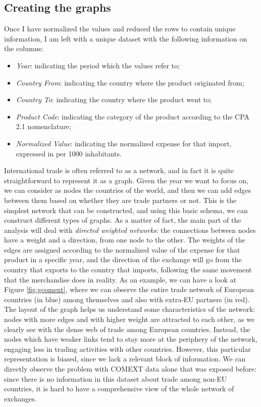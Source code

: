\subsection{Creating the graphs}
Once I have normalized the values and reduced the rows to contain unique information, I am left with a unique dataset with the following information on the columns:
\begin{itemize}
    \item \textit{Year}: indicating the period which the values refer to;
    \item \textit{Country From}: indicating the country where the product originated from;
    \item \textit{Country To}: indicating the country where the product went to;
    \item \textit{Product Code}: indicating the category of the product according to the CPA 2.1 nomenclature;
    \item \textit{Normalized Value}: indicating the normalized expense for that import, expressed in \texteuro per 1000 inhabitants.
\end{itemize}
International trade is often referred to as a network, and in fact it is quite straightforward to represent it as a graph. Given the year we want to focus on, we can consider as nodes the countries of the world, and then we can add edges between them based on whether they are trade partners or not. This is the simplest network that can be constructed, and using this basic schema, we can construct different types of graphs. As a matter of fact, the main part of the analysis will deal with \textit{directed weighted networks}: the connections between nodes have a weight and a direction, from one node to the other. The weights of the edges are assigned according to the normalized value of the expense for that product in a specific year, and the direction of the exchange will go from the country that exports to the country that imports, following the same movement that the merchandise does in reality.
As an example, we can have a look at Figure \ref{fig:gcomext}, where we can observe the entire trade network of European countries (in blue) among themselves and also with extra-EU partners (in red). The layout of the graph helps us understand some characteristics of the network: nodes with more edges and with higher weight are attracted to each other, as we clearly see with the dense web of trade among European countries. Instead, the nodes which have weaker links tend to stay more at the periphery of the network, engaging less in trading activities with other countries. However, this particular representation is biased, since we lack a relevant block of information. We can directly observe the problem with COMEXT data alone that was exposed before: since there is no information in this dataset about trade among non-EU countries, it is hard to have a comprehensive view of the whole network of exchanges. 
